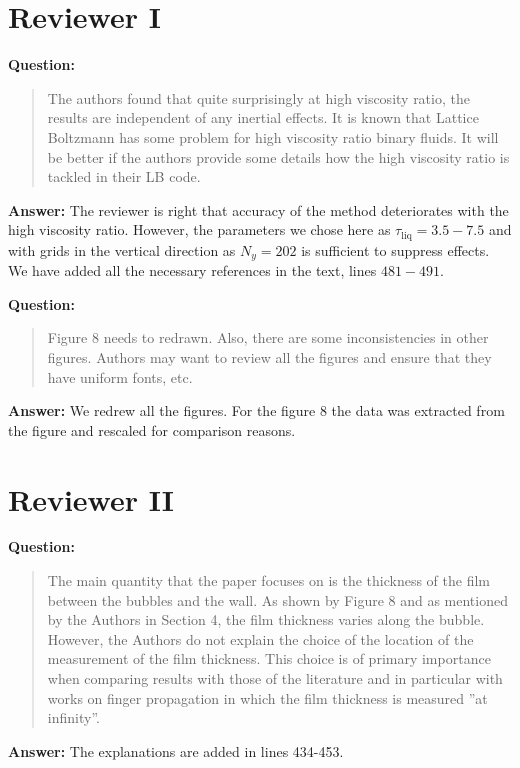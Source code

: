 \documentclass{article}
\begin{document}
\section{Reviewer I}

\textbf{Question:}
\begin{quotation}
The authors found that quite surprisingly at high viscosity ratio, the results are
independent of any inertial effects. It is known that Lattice Boltzmann has some problem for high
viscosity ratio binary fluids. It will be better if the authors provide some details how the high
viscosity ratio is tackled in their LB code.
\end{quotation}

\textbf{Answer:} The reviewer is right that accuracy of the method deteriorates with the high
viscosity ratio. However, the parameters we chose here as $\tau_{\mathrm{liq}}=3.5-7.5$ and with
grids in the vertical direction as $N_y=202$ is sufficient to suppress effects. We have added all
the necessary references in the text, lines $481-491$.

\textbf{Question:}
\begin{quotation}
Figure 8 needs to redrawn. Also, there are some inconsistencies in other figures. Authors may
want to review all the figures and ensure that they have uniform fonts, etc.
\end{quotation}

\textbf{Answer:} We redrew all the figures. For the figure 8 the data was extracted from the
figure and rescaled for comparison reasons.

\section{Reviewer II}

\textbf{Question:}
\begin{quotation}
The main quantity that the paper focuses on is the thickness of the film between the bubbles and the
wall. As shown by Figure 8 and as mentioned by the Authors in Section 4, the film thickness varies
along the bubble. However, the Authors do not explain the choice of the location of the measurement
of the film thickness. This choice is of primary importance when comparing results with those of
the
literature and in particular with works on finger propagation in which the film thickness is
measured
”at infinity”.
\end{quotation}

\textbf{Answer:} The explanations are added in lines 434-453.
 
\end{document}
